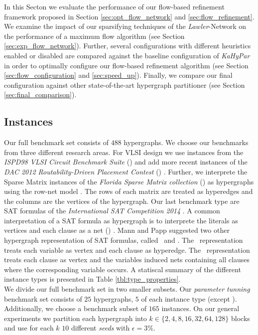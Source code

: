 In this Secton we evaluate the performance of our flow-based refinement framework proposed
in Section \ref{sec:opt_flow_network} and \ref{sec:flow_refinement}. We examine
the impact of our sparsifying techniques of the \emph{Lawler}-Network \cite{lawler1973} on the
performance of a maximum flow algorithm (see Section \ref{sec:exp_flow_network}). Further,
several configurations with different heuristics enabled or disabled are
compared against the baseline configuration of \emph{KaHyPar} in order to optimally
configure our flow-based refinement algorithm (see Section \ref{sec:flow_configuration} and
\ref{sec:speed_up}). Finally, we compare our final configuration against other
state-of-the-art hypergraph partitioner (see Section \ref{sec:final_comparison}).


\subsection{Instances}

Our full benchmark set consists of $488$ hypergraphs. We choose our benchmarks 
from three different research areas. For VLSI design we use instances from
the \emph{ISPD98 VLSI Circuit Benchmark Suite} (\ISPD) \cite{alpert1998ispd98} and add more recent
instances of the \emph{DAC 2012 Routability-Driven Placement Contest} (\DAC) \cite{viswanathan2012dac}.
Further, we interprete the Sparse Matrix instances of the \emph{Florida Sparse Matrix 
collection} (\SPM) \cite{davis2011university} as hypergraphs using the row-net model \cite{catalyurek1999hypergraph}.
The rows of each matrix are treated as hyperedges and the columns are the vertices of
the hypergraph. Our last benchmark type are SAT formulas of the \emph{International SAT
Competition 2014} \cite{belov2014application}. A common interpretation of a SAT formula 
as hypergraph is to interprete the literals as vertices and each clause as a net (\Literal) \cite{papa2007hypergraph}.
Mann and Papp \cite{mann2014formula} suggested two other hypergraph representation of
SAT formulas, called \Primal~and \Dual. The \Primal~representation treats each variable
as vertex and each clause as hyperedge. The \Dual~representation treats each clause as
vertex and the variables induced nets containing all clauses where the corresponding
variable occurs. A statiscal summary of the different instance types is presented in
Table \ref{tbl:type_properties}. \\
We divide our full benchmark set in two smaller subsets. Our \emph{parameter tunning}
benchmark set consists of $25$ hypergraphs, $5$ of each instance type (except \DAC). Additionally,
we choose a benchmark subset of $165$ instances. On our general experiments we partition
each hypergraph into $k \in \{2,4,8,16,32,64,128\}$ blocks and use for each $k$ $10$ different
\emph{seeds} with $\epsilon = 3\%$.

